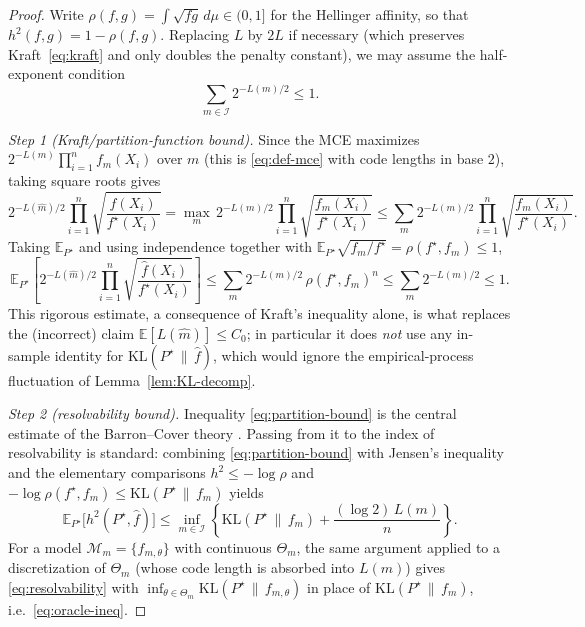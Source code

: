 \documentclass[12pt]{article}
\numberwithin{equation}{section}
\begin{document}
	\begin{proof}
	Write $\rho(f,g)=\int\sqrt{fg}\,d\mu\in(0,1]$ for the Hellinger affinity,
	so that $h^2(f,g)=1-\rho(f,g)$. Replacing $L$ by $2L$ if necessary (which
	preserves Kraft~\eqref{eq:kraft} and only doubles the penalty constant), we
	may assume the half-exponent condition
	\begin{equation}\label{eq:half-kraft}
		\sum_{m\in\mathcal{I}} 2^{-L(m)/2} \le 1 .
	\end{equation}

	\emph{Step 1 (Kraft/partition-function bound).}
	Since the MCE maximizes $2^{-L(m)}\prod_{i=1}^n f_m(X_i)$ over $m$
	(this is \eqref{eq:def-mce} with code lengths in base $2$), taking square
	roots gives
	\[
	2^{-L(\widehat m)/2}\prod_{i=1}^n\sqrt{\frac{\widehat f(X_i)}{f^{\star}(X_i)}}
	= \max_{m}\, 2^{-L(m)/2}\prod_{i=1}^n\sqrt{\frac{f_m(X_i)}{f^{\star}(X_i)}}
	\le \sum_{m} 2^{-L(m)/2}\prod_{i=1}^n\sqrt{\frac{f_m(X_i)}{f^{\star}(X_i)}}.
	\]
	Taking $\mathbb{E}_{P^{\star}}$ and using independence together with
	$\mathbb{E}_{P^{\star}}\sqrt{f_m/f^{\star}}=\rho(f^{\star},f_m)\le 1$,
	\begin{equation}\label{eq:partition-bound}
		\mathbb{E}_{P^{\star}}\!\left[
		2^{-L(\widehat m)/2}\prod_{i=1}^n\sqrt{\frac{\widehat f(X_i)}{f^{\star}(X_i)}}
		\right]
		\le \sum_{m} 2^{-L(m)/2}\,\rho(f^{\star},f_m)^n
		\le \sum_{m} 2^{-L(m)/2} \le 1 .
	\end{equation}
	This rigorous estimate, a consequence of Kraft's inequality alone, is what
	replaces the (incorrect) claim $\mathbb{E}[L(\widehat m)]\le C_0$; in
	particular it does \emph{not} use any in-sample identity for
	$\mathrm{KL}(P^{\star}\,\|\,\widehat f)$, which would ignore the
	empirical-process fluctuation of Lemma~\ref{lem:KL-decomp}.

	\emph{Step 2 (resolvability bound).}
	Inequality \eqref{eq:partition-bound} is the central estimate of the
	Barron--Cover theory \citep{BarronRissanenYu1998}. Passing from it to the
	index of resolvability is standard: combining \eqref{eq:partition-bound}
	with Jensen's inequality and the elementary comparisons $h^2\le-\log\rho$
	and $-\log\rho(f^{\star},f_m)\le \mathrm{KL}(P^{\star}\,\|\,f_m)$ yields
	\begin{equation}\label{eq:resolvability}
		\mathbb{E}_{P^{\star}}\big[h^2(P^{\star},\widehat f)\big]
		\le \inf_{m\in\mathcal{I}}
		\left\{ \mathrm{KL}(P^{\star}\,\|\,f_m) + \frac{(\log 2)\,L(m)}{n}\right\}.
	\end{equation}
	For a model $\mathcal{M}_m=\{f_{m,\theta}\}$ with continuous $\Theta_m$, the
	same argument applied to a discretization of $\Theta_m$ (whose code length
	is absorbed into $L(m)$) gives \eqref{eq:resolvability} with
	$\inf_{\theta\in\Theta_m}\mathrm{KL}(P^{\star}\,\|\,f_{m,\theta})$ in place
	of $\mathrm{KL}(P^{\star}\,\|\,f_m)$, i.e.\ \eqref{eq:oracle-ineq}.
\end{proof}
\end{document}
